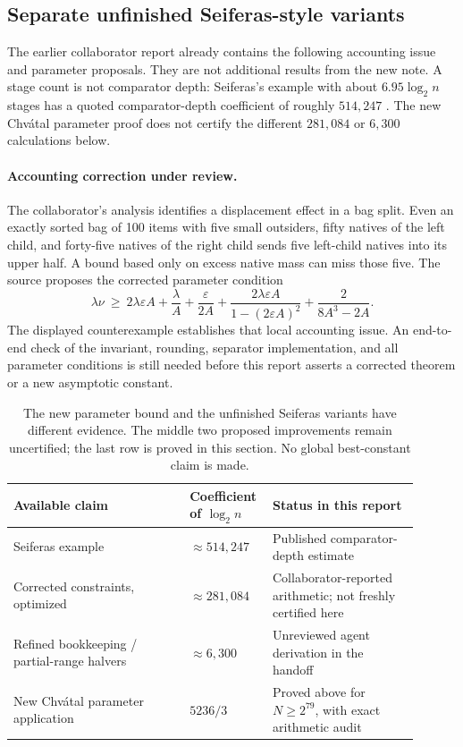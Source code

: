 \documentclass[11pt]{article}
\begin{document}
\subsection{Separate unfinished Seiferas-style variants}
The earlier collaborator report already contains the following accounting issue and parameter proposals. They are not additional results from the new note. A stage count is not comparator depth: Seiferas's example with about $6.95\log_2n$ stages has a quoted comparator-depth coefficient of roughly $514{,}247$ \cite{seiferas}. The new Chv\'atal parameter proof does not certify the different $281{,}084$ or $6{,}300$ calculations below.

\paragraph{Accounting correction under review.}
The collaborator's analysis identifies a displacement effect in a bag split. Even an exactly sorted bag of 100 items with five small outsiders, fifty natives of the left child, and forty-five natives of the right child sends five left-child natives into its upper half. A bound based only on excess native mass can miss those five. The source proposes the corrected parameter condition
\[
\lambda\nu\ \ge\ 2\lambda\varepsilon A+\frac{\lambda}{A}
 +\frac{\varepsilon}{2A}
 +\frac{2\lambda\varepsilon A}{1-(2\varepsilon A)^2}
 +\frac{2}{8A^3-2A}.
\]
The displayed counterexample establishes that local accounting issue. An end-to-end check of the invariant, rounding, separator implementation, and all parameter conditions is still needed before this report asserts a corrected theorem or a new asymptotic constant.

\begin{table}[ht]
\centering
\begin{tabular}{p{0.41\linewidth}p{0.15\linewidth}p{0.34\linewidth}}
\toprule Available claim & Coefficient of $\log_2 n$ & Status in this report\\\midrule
Seiferas example & $\approx514{,}247$ & Published comparator-depth estimate\\
Corrected constraints, optimized & $\approx281{,}084$ & Collaborator-reported arithmetic; not freshly certified here\\
Refined bookkeeping / partial-range halvers & $\approx6{,}300$ & Unreviewed agent derivation in the handoff\\
New Chv\'atal parameter application & $5236/3$ & Proved above for $N\ge2^{79}$, with exact arithmetic audit\\\bottomrule
\end{tabular}
\caption{The new parameter bound and the unfinished Seiferas variants have different evidence. The middle two proposed improvements remain uncertified; the last row is proved in this section. No global best-constant claim is made.}\label{tab:aksstatus}
\end{table}
\end{document}
